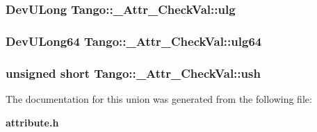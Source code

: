 \subsubsection[{ulg}]{\setlength{\rightskip}{0pt plus 5cm}Dev\-U\-Long Tango\-::\-\_\-\-Attr\-\_\-\-Check\-Val\-::ulg}\label{unionTango_1_1__Attr__CheckVal_a61b2a45b6e761f2660f516fab08d76c9}
\subsubsection[{ulg64}]{\setlength{\rightskip}{0pt plus 5cm}Dev\-U\-Long64 Tango\-::\-\_\-\-Attr\-\_\-\-Check\-Val\-::ulg64}\label{unionTango_1_1__Attr__CheckVal_af922febda3c28b8e89f4536e062e6d42}
\subsubsection[{ush}]{\setlength{\rightskip}{0pt plus 5cm}unsigned short Tango\-::\-\_\-\-Attr\-\_\-\-Check\-Val\-::ush}\label{unionTango_1_1__Attr__CheckVal_abebf8bf262871069fdc66fc7171b8e76}


The documentation for this union was generated from the following file\-:\begin{DoxyCompactItemize}
\item 
{\bf attribute.\-h}\end{DoxyCompactItemize}
